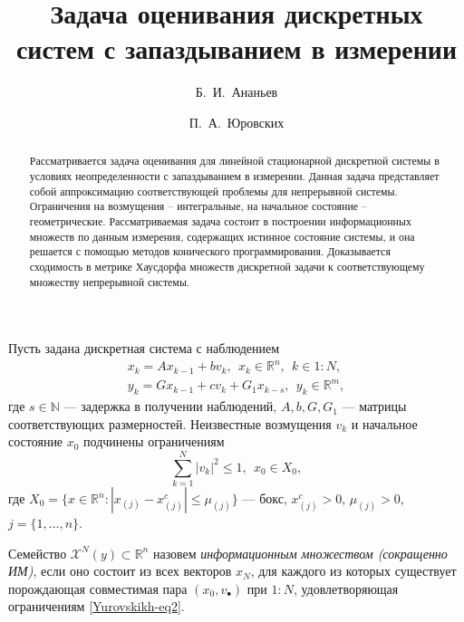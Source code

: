 \title{Задача оценивания дискретных систем с запаздыванием в измерении
}
\author{Б.~И.~Ананьев   \and П.~А.~Юровских 
} %
\maketitle
\begin{abstract}
Рассматривается задача оценивания для линейной стационарной дискретной системы в
условиях неопределенности с запаздыванием в измерении. Данная задача представляет собой
аппроксимацию соответствующей проблемы для непрерывной системы. Ограничения на
возмущения -- интегральные, на начальное состояние -- геометрические. Рассматриваемая
задача состоит в построении информационных множеств по данным измерения, содержащих
истинное состояние системы, и она решается с помощью методов конического
программирования. Доказывается сходимость в метрике Хаусдорфа множеств дискретной
задачи к соответствующему множеству непрерывной системы. 
\end{abstract}

Пусть задана дискретная система с наблюдением
\begin{equation}\label{Yurovskikh-eq1}
	\begin{gathered}
		x_k=Ax_{k-1} + bv_k, \ \ x_k\in\mathbb{R}^n, \ \ k\in1:N, \\
		y_k=Gx_{k-1} + cv_k + G_1x_{k-s},\ \ y_k\in\mathbb{R}^m,
	\end{gathered}	
\end{equation}
где $s\in \mathbb{N}$ --- задержка в получении наблюдений, $A,b,G,G_1$ --- матрицы
соответствующих размерностей. Неизвестные возмущения $v_k$ и начальное состояние $x_0$
подчинены ограничениям
\begin{equation}\label{Yurovskikh-eq2}
	\sum_{k=1}^N|v_k|^2\leq 1, \ \ x_0\in X_0,
\end{equation}
где $X_0 = \{x\in\mathbb{R}^n:|x_{(j)}-x_{(j)}^c| \leq \mu_{(j)}\}$ --- бокс,  $x_{(j)}^c
> 0 $,  $ \mu_{(j)} > 0$, $j = \{1,\ldots,n\}$.
\begin{definition}\label{Yurovskikh-Dfn2}
Семейство $\mathcal{X}^N(y)\subset\mathbb{R}^n$ назовем \emph{информационным множеством
(сокращенно ИМ)}, если оно состоит из всех векторов $x_N$, для каждого из которых
существует порождающая совместимая пара $(x_0,v_\bullet)$ при $1:N$, удовлетворяющая
ограничениям \eqref{Yurovskikh-eq2}.
\end{definition}

